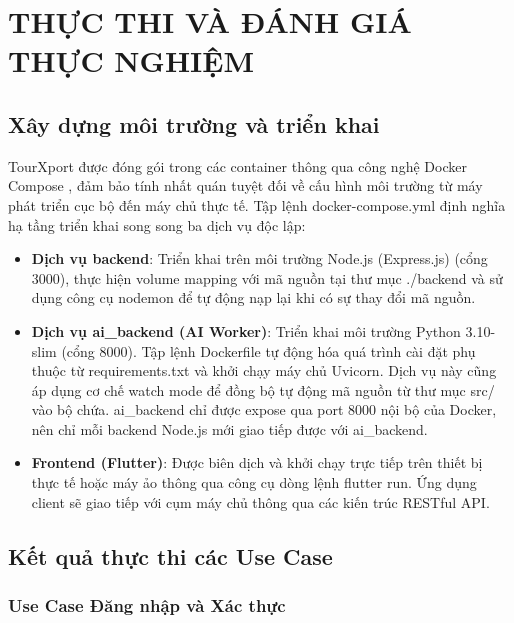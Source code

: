 \chapter{THỰC THI VÀ ĐÁNH GIÁ THỰC NGHIỆM}

\section{Xây dựng môi trường và triển khai}

\quad TourXport được đóng gói trong các container thông qua công nghệ Docker Compose \cite{docker_compose}, đảm bảo tính nhất quán tuyệt đối về cấu hình môi trường từ máy phát triển cục bộ đến máy chủ thực tế. Tập lệnh docker-compose.yml định nghĩa hạ tầng triển khai song song ba dịch vụ độc lập:

\begin{itemize}
    \item \textbf{Dịch vụ backend}: Triển khai trên môi trường Node.js (Express.js) \cite{nodejs,expressjs} (cổng 3000), thực hiện volume mapping với mã nguồn tại thư mục ./backend và sử dụng công cụ nodemon để tự động nạp lại khi có sự thay đổi mã nguồn.
    
    \item \textbf{Dịch vụ ai\_backend (AI Worker)}: Triển khai môi trường Python 3.10-slim (cổng 8000). Tập lệnh Dockerfile tự động hóa quá trình cài đặt phụ thuộc từ requirements.txt và khởi chạy máy chủ Uvicorn. Dịch vụ này cũng áp dụng cơ chế watch mode để đồng bộ tự động mã nguồn từ thư mục src/ vào bộ chứa. ai\_backend chỉ được expose qua port 8000 nội bộ của Docker, nên chỉ mỗi backend Node.js mới giao tiếp được với ai\_backend.
    
    \item \textbf{Frontend (Flutter)}: Được biên dịch và khởi chạy trực tiếp trên thiết bị thực tế hoặc máy ảo thông qua công cụ dòng lệnh flutter run. Ứng dụng client sẽ giao tiếp với cụm máy chủ thông qua các kiến trúc RESTful API.
\end{itemize}

\section{Kết quả thực thi các Use Case}

\subsection{Use Case Đăng nhập và Xác thực}

